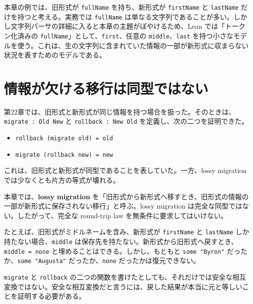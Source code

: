本章の例では、旧形式が \texttt{fullName} を持ち、新形式が \texttt{firstName} と \texttt{lastName} だけを持つと考える。実務では \texttt{fullName} は単なる文字列であることが多い。しかし文字列パーサの詳細に入ると本章の主題がぼやけるため、Lean では「トークン化済みの \texttt{fullName}」として、\texttt{first}、任意の \texttt{middle}、\texttt{last} を持つ小さなモデルを使う。これは、生の文字列に含まれていた情報の一部が新形式に収まらない状況を表すためのモデルである。


\section{情報が欠ける移行は同型ではない}

第22章では、旧形式と新形式が同じ情報を持つ場合を扱った。そのときは、\texttt{migrate : Old \textrightarrow New} と \texttt{rollback : New \textrightarrow Old} を定義し、次の二つを証明できた。

\begin{itemize}
\item \texttt{rollback (migrate old) = old}
\item \texttt{migrate (rollback new) = new}
\end{itemize}

これは、旧形式と新形式が同型であることを表していた。一方、lossy migration では少なくとも片方の等式が壊れる。

\begin{definitionbox}
本章では、\textbf{lossy migration} を「旧形式から新形式へ移すとき、旧形式の情報の一部が新形式に保存されない移行」と呼ぶ。lossy migration は完全な同型ではない。したがって、完全な round-trip law を無条件に要求してはいけない。
\end{definitionbox}

たとえば、旧形式がミドルネームを含み、新形式が \texttt{firstName} と \texttt{lastName} しか持たない場合、\texttt{middle} は保存先を持たない。新形式から旧形式へ戻すとき、\texttt{middle = none} と埋めることはできる。しかし、もともと \texttt{some "Byron"} だったか、\texttt{some "Augusta"} だったか、\texttt{none} だったかは復元できない。

\begin{warningbox}
\texttt{migrate} と \texttt{rollback} の二つの関数を書けたとしても、それだけでは安全な相互変換ではない。安全な相互変換だと言うには、戻した結果が本当に元と等しいことを証明する必要がある。
\end{warningbox}

